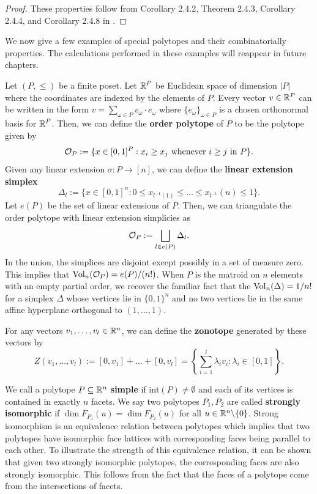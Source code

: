 \documentclass{puthesis-UG}
\begin{document}
\begin{proof}
	These properties follow from Corollary 2.4.2, Theorem 2.4.3, Corollary 2.4.4, and Corollary 2.4.8 in \cite{schneider_2013}. 
\end{proof}

We now give a few examples of special polytopes and their combinatorially properties. The calculations performed in these examples will reappear in future chapters. 

\begin{example}
	Let $(P, \leq)$ be a finite poset. Let $\mathbb{R}^P$ be Euclidean space of dimension $|P|$ where the coordinates are indexed by the elements of $P$. Every vector $v \in \mathbb{R}^P$ can be written in the form $v = \sum_{\omega \in P} v_\omega \cdot e_\omega$ where $\{e_\omega\}_{\omega \in P}$ is a chosen orthonormal basis for $\mathbb{R}^P$. Then, we can define the \textbf{order polytope} of $P$ to be the polytope given by
	\[
		\mathcal{O}_P := \{x \in [0, 1]^P : x_{i} \geq x_{j} \text{ whenever } i \geq j \text{ in } P\}.
	\]
	Given any linear extension $\sigma : P \to [n]$, we can define the \textbf{linear extension simplex}
	\[
		\Delta_l := \{x \in [0, 1]^n : 0 \leq x_{l^{-1}(1)} \leq \ldots \leq x_{l^{-1}}(n) \leq 1\}.
	\]
	Let $e(P)$ be the set of linear extensions of $P$. Then, we can triangulate the order polytope with linear extension simplicies as
	\[
		\mathcal{O}_P := \bigsqcup_{l \in e(P)} \Delta_l.
	\]
	In the union, the simplices are disjoint except possibly in a set of measure zero. This implies that $\operatorname{Vol}_n(\mathcal{O}_P) = e(P) / (n!)$. When $P$ is the matroid on $n$ elements with an empty partial order, we recover the familiar fact that the $\operatorname{Vol}_n(\Delta) = 1/n!$ for a simplex $\Delta$ whose vertices lie in $\{0, 1\}^n$ and no two vertices lie in the same affine hyperplane orthogonal to $(1, \ldots, 1)$.  
\end{example}

\begin{example}[Zonotope] \label{zonotope-example}
	For any vectors $v_1, \ldots, v_l \in \mathbb{R}^n$, we can define the \textbf{zonotope} generated by these vectors by 
	\[
		Z(v_1, \ldots, v_l) := [0, v_1] + \ldots + [0, v_l] = \left \{ \sum_{i = 1}^l \lambda_i v_i : \lambda_i \in [0, 1] \right \}.
	\]
\end{example}
We call a polytope $P \subseteq \mathbb{R}^n$ \textbf{simple} if $\text{int} (P) \neq \emptyset$ and each of its vertices is contained in exactly $n$ facets. We say two polytopes $P_1, P_2$ are called \textbf{strongly isomorphic} if $\dim F_{P_1}(u) = \dim F_{P_2}(u)$ for all $u \in \mathbb{R}^n \backslash \{0\}$. Strong isomorphism is an equivalence relation between polytopes which implies that two polytopes have isomorphic face lattices with corresponding faces being parallel to each other. To illustrate the strength of this equivalence relation, it can be shown that given two strongly isomorphic polytopes, the corresponding faces are also strongly isomorphic. This follows from the fact that the faces of a polytope come from the intersections of facets. 
\end{document}
